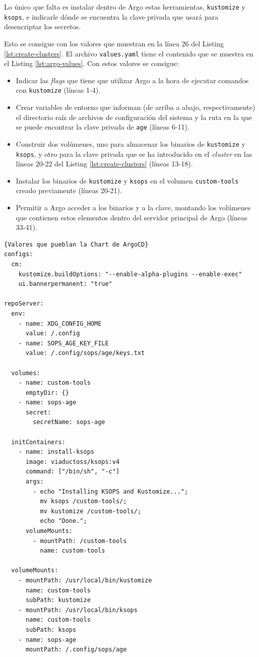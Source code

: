 Lo único que falta es instalar dentro de Argo estas herramientas, \texttt{kustomize} y \texttt{ksops}, e indicarle dónde se encuentra la clave privada que usará para desencriptar los secretos.

Esto se consigue con los valores que muestran en la línea 26 del Listing \ref{lst:create-clusters}. El archivo \texttt{values.yaml} tiene el contenido que se muestra en el Listing \ref{lst:argo-values}. Con estos valores se consigue:

\begin{itemize}
  \item Indicar las \textit{flags} que tiene que utilizar Argo a la hora de ejecutar comandos con \texttt{kustomize} (líneas 1-4).
  \item Crear variables de entorno que informan (de arriba a abajo, respectivamente) el directorio raíz de archivos de configuración del sistema y la ruta en la que se puede encontrar la clave privada de \texttt{age} (líneas 6-11).
  \item Construir dos volúmenes, uno para almacenar los binarios de \texttt{kustomize} y \texttt{ksops}, y otro para la clave privada que se ha introducido en el \textit{cluster} en las líneas 20-22 del Listing \ref{lst:create-clusters} (líneas 13-18).
  \item Instalar los binarios de \texttt{kustomize} y \texttt{ksops} en el volumen \texttt{custom-tools} creado previamente (líneas 20-21).
  \item Permitir a Argo acceder a los binarios y a la clave, montando los volúmenes que contienen estos elementos dentro del servidor principal de Argo (líneas 33-41).
\end{itemize}

\begin{lstlisting}[language=helm,label=lst:argo-values]{Valores que pueblan la Chart de ArgoCD}
configs:
  cm:
    kustomize.buildOptions: "--enable-alpha-plugins --enable-exec"
    ui.bannerpermanent: "true"

repoServer:
  env:
    - name: XDG_CONFIG_HOME
      value: /.config
    - name: SOPS_AGE_KEY_FILE
      value: /.config/sops/age/keys.txt

  volumes:
    - name: custom-tools
      emptyDir: {}
    - name: sops-age
      secret:
        secretName: sops-age

  initContainers:
    - name: install-ksops
      image: viaductoss/ksops:v4
      command: ["/bin/sh", "-c"]
      args:
        - echo "Installing KSOPS and Kustomize...";
          mv ksops /custom-tools/;
          mv kustomize /custom-tools/;
          echo "Done.";
      volumeMounts:
        - mountPath: /custom-tools
          name: custom-tools

  volumeMounts:
    - mountPath: /usr/local/bin/kustomize
      name: custom-tools
      subPath: kustomize
    - mountPath: /usr/local/bin/ksops
      name: custom-tools
      subPath: ksops
    - name: sops-age
      mountPath: /.config/sops/age
\end{lstlisting}

